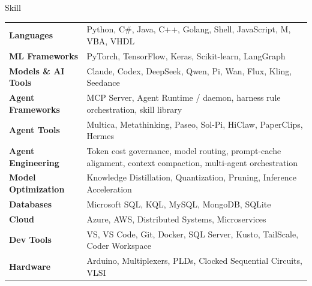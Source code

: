 \documentclass{resume} %
\begin{document}
\begin{rSection}{Skill}

    \begin{tabular}{ @{} >{\bfseries}l @{\hspace{5ex}} p{12cm} }
        Languages           & Python, C\#, Java, C++, Golang, Shell, JavaScript, M, VBA, VHDL       \\
        ML Frameworks       & PyTorch, TensorFlow, Keras, Scikit-learn, LangGraph                   \\
        Models \& AI Tools  & Claude, Codex, DeepSeek, Qwen, Pi, Wan, Flux, Kling, Seedance         \\
        Agent Frameworks    & MCP Server, Agent Runtime / daemon, harness rule orchestration, skill library \\
        Agent Tools         & Multica, Metathinking, Paseo, Sol-Pi, HiClaw, PaperClips, Hermes    \\
        Agent Engineering   & Token cost governance, model routing, prompt-cache alignment, context compaction, multi-agent orchestration \\
        Model Optimization  & Knowledge Distillation, Quantization, Pruning, Inference Acceleration \\
        Databases           & Microsoft SQL, KQL, MySQL, MongoDB, SQLite                            \\
        Cloud               & Azure, AWS, Distributed Systems, Microservices                        \\
        Dev Tools           & VS, VS Code, Git, Docker, SQL Server, Kusto, TailScale, Coder Workspace \\
        Hardware            & Arduino, Multiplexers, PLDs, Clocked Sequential Circuits, VLSI        \\
    \end{tabular}

\end{rSection}


\end{document}
